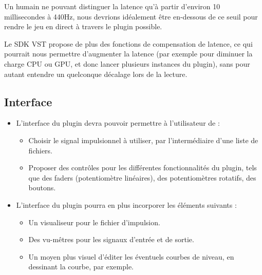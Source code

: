 			Un humain ne pouvant distinguer la latence qu'à partir d'environ 10 millisecondes à 440Hz, nous devrions idéalement être en-dessous de ce seuil pour rendre le jeu en direct à travers le plugin possible.

			Le SDK VST propose de plus des fonctions de compensation de latence, ce qui pourrait nous permettre d'augmenter la latence (par exemple pour diminuer la charge CPU ou GPU, et donc lancer plusieurs instances du plugin), sans pour autant entendre un quelconque décalage lors de la lecture.

		\subsection{Interface}
			\begin{itemize}
				\item L'interface du plugin devra pouvoir permettre à l'utilisateur de :
				\begin{itemize}
					\item Choisir le signal impulsionnel à utiliser, par l'intermédiaire d'une liste de fichiers.
					\item Proposer des contrôles pour les différentes fonctionnalités du plugin, tels que des faders (potentiomètre linéaires), des potentiomètres rotatifs, des boutons.
				\end{itemize}
				\item L'interface du plugin pourra en plus incorporer les éléments suivants : 
				\begin{itemize}
					\item Un visualiseur pour le fichier d'impulsion.
					\item Des vu-mêtres pour les signaux d'entrée et de sortie.
					\item Un moyen plus visuel d'éditer les éventuels courbes de niveau, en dessinant la courbe, par exemple.
				\end{itemize}
			\end{itemize}


